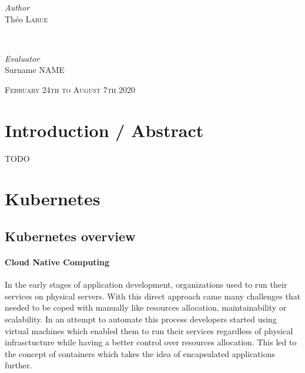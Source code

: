 \documentclass[12pt]{report}
\begin{document}
\begin{titlepage}
    \begin{minipage}{0.4\textwidth}
        \begin{flushleft}
            \large
	    \textit{Author}\\
            Théo \textsc{Larue}
        \end{flushleft}
    \end{minipage}
    ~
    \begin{minipage}{0.4\textwidth}
        \begin{flushright}
            \large
	    \textit{Evaluator}\\
	    Surname \textsc{NAME}
        \end{flushright}
    \end{minipage}

    \vspace{2cm}

    \vspace{2cm}
    \vfill
    \textsc{\large February 24th to August 7th 2020}\\[0.5cm]


\end{titlepage}

\tableofcontents
\newpage

\chapter{Introduction / Abstract}
TODO


\chapter{Kubernetes} 

\section{Kubernetes overview}

\subsubsection{Cloud Native Computing}
In the early stages of application development, organizations used to run their
services on physical servers. With this direct approach came many challenges
that needed to be coped with manually like resources allocation,
maintainability or scalability. In an attempt to automate this process
developers started using virtual machines which enabled them to run their
services regardless of physical infrasctucture while having a better control
over resources allocation.  This led to the concept of containers which takes
the idea of encapsulated applications further.
\end{document}
